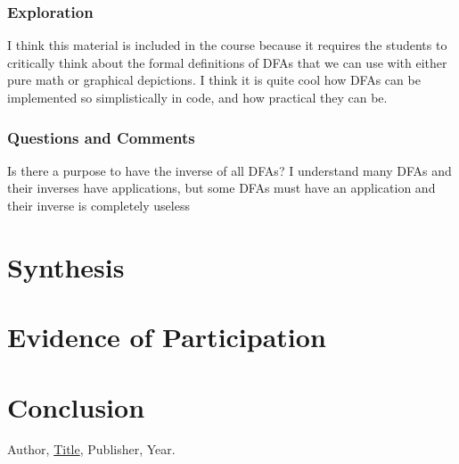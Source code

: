\documentclass{article}
\theoremstyle{theorem}
\theoremstyle{definition}
\theoremstyle{remark}
\begin{document}
\subsubsection{Exploration}
I think this material is included in the course because it requires the students to critically think about the formal definitions of DFAs that we can use with either pure math or graphical depictions. I think it is quite cool how DFAs can be implemented so simplistically in code, and how practical they can be. 

\subsubsection{Questions and Comments}
Is there a purpose to have the inverse of all DFAs? I understand many DFAs and their inverses have applications, but some DFAs must have an application and their inverse is completely useless


\section{Synthesis}

\section{Evidence of Participation}

\section{Conclusion}\label{conclusion}

\begin{thebibliography}{99}
 Author, \href{https://en.wikipedia.org/wiki/LaTeX}{Title}, Publisher, Year.
\end{thebibliography}
\end{document}
